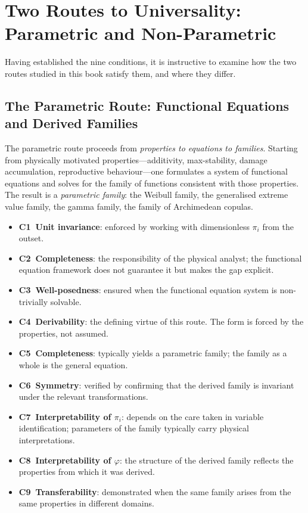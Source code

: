 \section{Two Routes to Universality: Parametric and Non-Parametric}
\label{sec:ucq:tworoutes}

Having established the nine conditions, it is instructive to
examine how the two routes studied in this book satisfy them, and
where they differ.

\subsection{The Parametric Route: Functional Equations and Derived Families}
\label{ssec:ucq:parametric}

The parametric route proceeds from \emph{properties to equations
to families}.  Starting from physically motivated
properties---additivity, max-stability, damage accumulation,
reproductive behaviour---one formulates a system of functional
equations and solves for the family of functions consistent with
those properties.  The result is a \emph{parametric family}: the
Weibull family, the generalised extreme value family, the gamma
family, the family of Archimedean copulas.

\begin{itemize}[leftmargin=2.5em]
  \item \textbf{C1~Unit invariance}: enforced by working with
    dimensionless $\pi_i$ from the outset.
  \item \textbf{C2~Completeness}: the responsibility of the physical
    analyst; the functional equation framework does not guarantee it
    but makes the gap explicit.
  \item \textbf{C3~Well-posedness}: ensured when the functional
    equation system is non-trivially solvable.
  \item \textbf{C4~Derivability}: the defining virtue of this route.
    The form is forced by the properties, not assumed.
  \item \textbf{C5~Completeness}: typically yields a parametric
    family; the family as a whole is the general equation.
  \item \textbf{C6~Symmetry}: verified by confirming that the derived
    family is invariant under the relevant transformations.
  \item \textbf{C7~Interpretability of $\pi_i$}: depends on the care
    taken in variable identification; parameters of the family
    typically carry physical interpretations.
  \item \textbf{C8~Interpretability of $\varphi$}: the structure of
    the derived family reflects the properties from which it was
    derived.
  \item \textbf{C9~Transferability}: demonstrated when the same
    family arises from the same properties in different domains.
\end{itemize}


